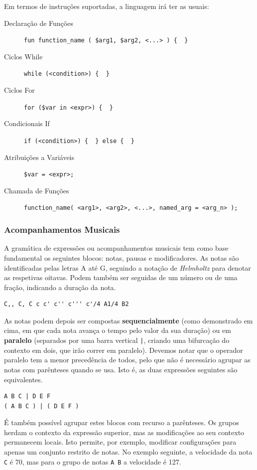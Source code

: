 Em termos de instruções suportadas, a linguagem irá ter as usuais:
\begin{description}
    \item[Declaração de Funções] \verb|fun function_name ( $arg1, $arg2, <...> ) {  }|
    \item[Ciclos While] \verb|while (<condition>) {  }|
    \item[Ciclos For] \verb|for ($var in <expr>) {  }|
    \item[Condicionais If] \verb|if (<condition>) {  } else {  }|
    \item[Atribuições a Variáveis] \verb|$var = <expr>;|
    \item[Chamada de Funções] \verb|function_name( <arg1>, <arg2>, <...>, named_arg = <arg_n> );|
\end{description}

\subsubsection{Acompanhamentos Musicais}
A gramática de expressões ou acompanhamentos musicais tem como base fundamental os seguintes blocos: notas, pausas e modificadores. As notas são identificadas pelas letras A até G, seguindo a notação de \textit{Helmholtz}\cite{helmholtz-pitch-notation} para denotar as respetivas oitavas. Podem também ser seguidas de um número ou de uma fração, indicando a duração da nota.

\begin{lstlisting}[caption={Exemplos de notas}]
C,, C, C c c' c'' c''' c'/4 A1/4 B2
\end{lstlisting}


As notas podem depois ser compostas \textbf{sequencialmente} (como demonstrado em cima, em que cada nota avança o tempo pelo valor da sua duração) ou em \textbf{paralelo} (separados por uma barra vertical \texttt{|}, criando uma bifurcação do contexto em dois, que irão correr em paralelo). Devemos notar que o operador paralelo tem a menor precedência de todos, pelo que não é necessário agrupar as notas com parênteses quando se usa. Isto é, as duas expressões seguintes são equivalentes.

\begin{lstlisting}
A B C | D E F
( A B C ) | ( D E F )
\end{lstlisting}

É também possível agrupar estes blocos com recurso a parênteses. Os grupos herdam o contexto da expressão superior, mas as modificações ao seu contexto permanecem locais. Isto permite, por exemplo, modificar configurações para apenas um conjunto restrito de notas. No exemplo seguinte, a velocidade da nota \texttt{C} é 70, mas para o grupo de notas \texttt{A B} a velocidade é 127.

